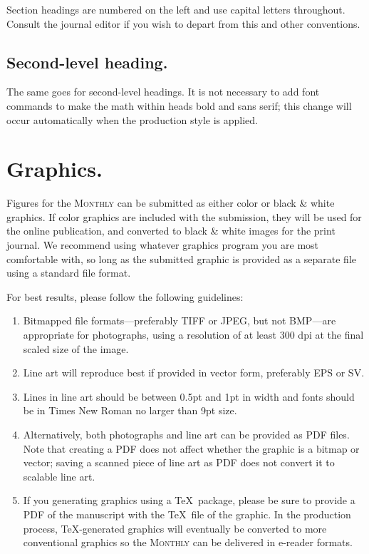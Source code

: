\documentclass{article}
\theoremstyle{plain}
\theoremstyle{definition}
\begin{document}
Section headings are numbered on the left and use capital letters throughout. Consult the journal editor if you wish to depart from this and other conventions.

\subsection{Second-level heading.}

The same goes for second-level headings.  It is not necessary to add font commands to make the math within heads bold and sans serif; this change will occur automatically when the production style is applied.

\section{Graphics.}

Figures for the \textsc{Monthly} can be submitted as either color or black \& white graphics.  If color graphics are included with the submission, they will be used for the online publication, and converted to black \& white images for the print journal.  We recommend using whatever graphics program you are most comfortable with, so long as the submitted graphic is provided as a separate file using a standard file format.

For best results, please follow the following guidelines:
\begin{enumerate}
\item Bitmapped file formats---preferably TIFF or JPEG, but not BMP---are appropriate for photographs, using a resolution of at least 300 dpi at the final scaled size of the image.
\item Line art will reproduce best if provided in vector form, preferably EPS or SV.
\item Lines in line art should be between 0.5pt and 1pt in width and fonts should be in Times New Roman no larger than 9pt size.
\item Alternatively, both photographs and line art can be provided as PDF files.  Note that creating a PDF does not affect whether the graphic is a bitmap or vector; saving a scanned piece of line art as PDF does not convert it to scalable line art.
\item If you generating graphics using a \TeX\ package, please be sure to provide a PDF of the manuscript with the \TeX\ file of the graphic.  In the production process, \TeX-generated graphics will eventually be converted to more conventional graphics so the \textsc{Monthly} can be delivered in e-reader formats.
\end{enumerate}
\end{document}
